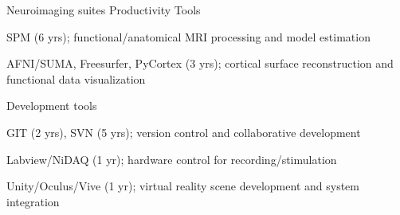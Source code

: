 \begin{cventries}
\cventry
    {Neuroimaging suites} %
    {Productivity Tools} %
    {\vspace*{-0.05cm}}
    {\vspace*{-0.05cm}} %
    {
      \begin{cvitems} %
        \item {SPM (6 yrs); functional/anatomical MRI processing and model estimation}
        \item {AFNI/SUMA, Freesurfer, PyCortex (3 yrs); cortical surface reconstruction and functional data visualization}
      \end{cvitems}
    }
    \vspace*{-0.2cm}
\cventry
	{Development tools}
	{\vspace*{-0.05cm}}
    {\vspace*{-0.05cm}}
    {\vspace*{-0.05cm}} %
    {
      \begin{cvitems} %
      	\item {GIT (2 yrs), SVN (5 yrs); version control and collaborative development}
      	\item {Labview/NiDAQ (1 yr); hardware control for recording/stimulation}
      	\item {Unity/Oculus/Vive (1 yr); virtual reality scene development and system integration}
      \end{cvitems}
    }
    \vspace*{-0.2cm}
\end{cventries}
